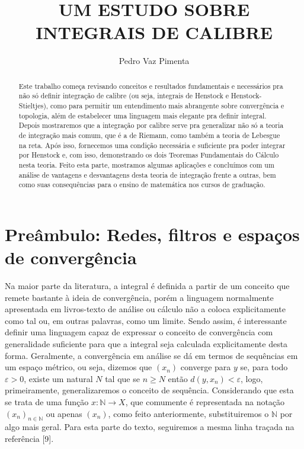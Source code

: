 \documentclass[12pt, a4paper]{article}
\title{\textbf{UM ESTUDO SOBRE INTEGRAIS DE CALIBRE}}
\author{Pedro Vaz Pimenta}
\theoremstyle{definition}
\begin{document}
\maketitle

\begin{abstract}
	
	Este trabalho começa revisando conceitos e resultados fundamentais e necessários pra não só definir integração de calibre (ou seja, integrais de Henstock e Henstock-Stieltjes), como para permitir um entendimento mais abrangente sobre convergência e topologia, além de estabelecer uma linguagem mais elegante pra definir integral. Depois mostraremos que a integração por calibre serve pra generalizar não só a teoria de integração mais comum, que é a de Riemann, como também a teoria de Lebesgue na reta. Após isso, fornecemos uma condição necessária e suficiente pra poder integrar por Henstock e, com isso, demonstrando os dois Teoremas Fundamentais do Cálculo nesta teoria. Feito esta parte, mostramos algumas aplicações e concluímos com um análise de vantagens e desvantagens desta teoria de integração frente a outras, bem como suas consequências para o ensino de matemática nos cursos de graduação.  
	
\end{abstract}

\section{Preâmbulo: Redes, filtros e espaços de convergência}

Na maior parte da literatura, a integral é definida a partir de um conceito que remete bastante à ideia de convergência, porém a linguagem normalmente apresentada em livros-texto de análise ou cálculo não a coloca explicitamente como tal ou, em outras palavras, como um limite. Sendo assim, é interessante definir uma linguagem capaz de expressar o conceito de convergência com generalidade suficiente para que a integral seja calculada explicitamente desta forma. Geralmente, a convergência em análise se dá em termos de sequências em um espaço métrico, ou seja, dizemos que $(x_n)$ converge para $y$ se, para todo $\varepsilon >0$, existe um natural $N$ tal que se $n\geq N$ então $d(y,x_n) < \varepsilon $, logo, primeiramente, generalizaremos o conceito de sequência. Considerando que esta se trata de uma função $x:\mathbb{N}\rightarrow X$, que comumente é representada na notação $(x_n)_{n\in \mathbb{N}}$ ou apenas $(x_n)$, como feito anteriormente, substituiremos o $\mathbb{N}$ por algo mais geral. Para esta parte do texto, seguiremos a mesma linha traçada na referência [9]. 
\end{document}
